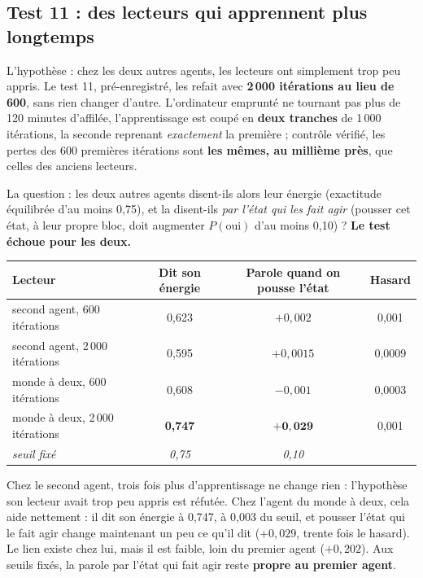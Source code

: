 \documentclass[fontsize=10pt,paper=a4,parskip=half-]{scrartcl}
\newcommand{\q}[1]{\og #1\fg{}}
\begin{document}
\subsection{Test 11 : des lecteurs qui apprennent plus longtemps}
L'hypothèse : chez les deux autres agents, les lecteurs ont simplement trop peu appris. Le
test 11, pré-enregistré, les refait avec \textbf{2\,000 itérations au lieu de 600}, sans
rien changer d'autre. L'ordinateur emprunté ne tournant pas plus de 120 minutes
d'affilée, l'apprentissage est coupé en \textbf{deux tranches} de 1\,000 itérations, la
seconde reprenant \emph{exactement} la première ; contrôle vérifié, les pertes des 600
premières itérations sont \textbf{les mêmes, au millième près}, que celles des anciens lecteurs.

La question : les deux autres agents disent-ils alors leur énergie (exactitude équilibrée
d'au moins 0,75), et la disent-ils \emph{par l'état qui les fait agir} (pousser cet état, à
leur propre bloc, doit augmenter $P(\text{oui})$ d'au moins 0,10) ? \textbf{Le test échoue
pour les deux.}

\begin{center}\small
\begin{tabular}{lccc}
\toprule
\textsf{Lecteur} & \textsf{Dit son énergie} & \textsf{Parole quand on pousse l'état} & \textsf{Hasard}\\
\midrule
second agent, 600 itérations & 0,623 & $+0,002$ & 0,001\\
second agent, 2\,000 itérations & 0,595 & $+0,0015$ & 0,0009\\
monde à deux, 600 itérations & 0,608 & $-0,001$ & 0,0003\\
monde à deux, 2\,000 itérations & \textbf{0,747} & $\mathbf{+0,029}$ & 0,001\\
\midrule
\emph{seuil fixé} & \emph{0,75} & \emph{0,10} & \\
\bottomrule
\end{tabular}
\end{center}

Chez le second agent, trois fois plus d'apprentissage ne change rien : l'hypothèse
\q{son lecteur avait trop peu appris} est réfutée. Chez l'agent du monde à deux, cela aide
nettement : il dit son énergie à 0,747, à 0,003 du seuil, et pousser l'état qui le fait
agir change maintenant un peu ce qu'il dit ($+0,029$, trente fois le hasard). Le lien
existe chez lui, mais il est faible, loin du premier agent ($+0,202$). Aux seuils fixés, la
parole par l'état qui fait agir reste \textbf{propre au premier agent}.
\end{document}
